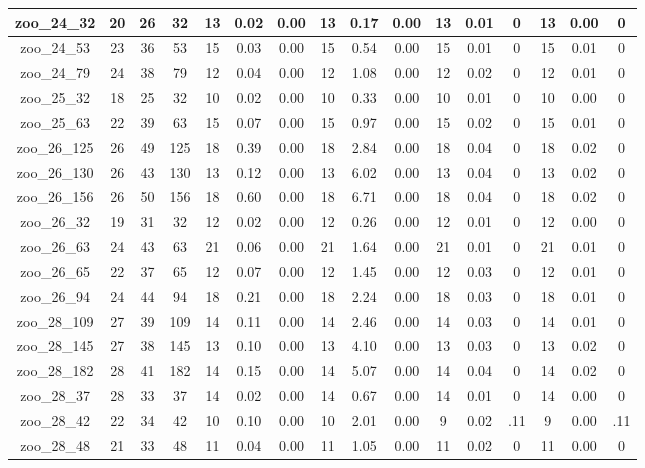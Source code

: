 \begin{landscape}
\begin{longtable}{|c|c|c|c|c|c|c|c|c|c|c|c|c|c|c|c|}
zoo\_24\_32 & 20 & 26 & 32 & 13 & 0.02 & 0.00 & 13 & 0.17 & 0.00 & 13 & 0.01 & 0 & 13 & 0.00 & 0 \\ \hline 
zoo\_24\_53 & 23 & 36 & 53 & 15 & 0.03 & 0.00 & 15 & 0.54 & 0.00 & 15 & 0.01 & 0 & 15 & 0.01 & 0 \\ \hline 
zoo\_24\_79 & 24 & 38 & 79 & 12 & 0.04 & 0.00 & 12 & 1.08 & 0.00 & 12 & 0.02 & 0 & 12 & 0.01 & 0 \\ \hline 
zoo\_25\_32 & 18 & 25 & 32 & 10 & 0.02 & 0.00 & 10 & 0.33 & 0.00 & 10 & 0.01 & 0 & 10 & 0.00 & 0 \\ \hline 
zoo\_25\_63 & 22 & 39 & 63 & 15 & 0.07 & 0.00 & 15 & 0.97 & 0.00 & 15 & 0.02 & 0 & 15 & 0.01 & 0 \\ \hline 
zoo\_26\_125 & 26 & 49 & 125 & 18 & 0.39 & 0.00 & 18 & 2.84 & 0.00 & 18 & 0.04 & 0 & 18 & 0.02 & 0 \\ \hline 
zoo\_26\_130 & 26 & 43 & 130 & 13 & 0.12 & 0.00 & 13 & 6.02 & 0.00 & 13 & 0.04 & 0 & 13 & 0.02 & 0 \\ \hline 
zoo\_26\_156 & 26 & 50 & 156 & 18 & 0.60 & 0.00 & 18 & 6.71 & 0.00 & 18 & 0.04 & 0 & 18 & 0.02 & 0 \\ \hline 
zoo\_26\_32 & 19 & 31 & 32 & 12 & 0.02 & 0.00 & 12 & 0.26 & 0.00 & 12 & 0.01 & 0 & 12 & 0.00 & 0 \\ \hline 
zoo\_26\_63 & 24 & 43 & 63 & 21 & 0.06 & 0.00 & 21 & 1.64 & 0.00 & 21 & 0.01 & 0 & 21 & 0.01 & 0 \\ \hline 
zoo\_26\_65 & 22 & 37 & 65 & 12 & 0.07 & 0.00 & 12 & 1.45 & 0.00 & 12 & 0.03 & 0 & 12 & 0.01 & 0 \\ \hline 
zoo\_26\_94 & 24 & 44 & 94 & 18 & 0.21 & 0.00 & 18 & 2.24 & 0.00 & 18 & 0.03 & 0 & 18 & 0.01 & 0 \\ \hline 
zoo\_28\_109 & 27 & 39 & 109 & 14 & 0.11 & 0.00 & 14 & 2.46 & 0.00 & 14 & 0.03 & 0 & 14 & 0.01 & 0 \\ \hline 
zoo\_28\_145 & 27 & 38 & 145 & 13 & 0.10 & 0.00 & 13 & 4.10 & 0.00 & 13 & 0.03 & 0 & 13 & 0.02 & 0 \\ \hline 
zoo\_28\_182 & 28 & 41 & 182 & 14 & 0.15 & 0.00 & 14 & 5.07 & 0.00 & 14 & 0.04 & 0 & 14 & 0.02 & 0 \\ \hline 
zoo\_28\_37 & 28 & 33 & 37 & 14 & 0.02 & 0.00 & 14 & 0.67 & 0.00 & 14 & 0.01 & 0 & 14 & 0.00 & 0 \\ \hline 
zoo\_28\_42 & 22 & 34 & 42 & 10 & 0.10 & 0.00 & 10 & 2.01 & 0.00 & 9 & 0.02 & .11 & 9 & 0.00 & .11 \\ \hline 
zoo\_28\_48 & 21 & 33 & 48 & 11 & 0.04 & 0.00 & 11 & 1.05 & 0.00 & 11 & 0.02 & 0 & 11 & 0.00 & 0 \\ \hline 

\end{longtable}
\end{landscape}
